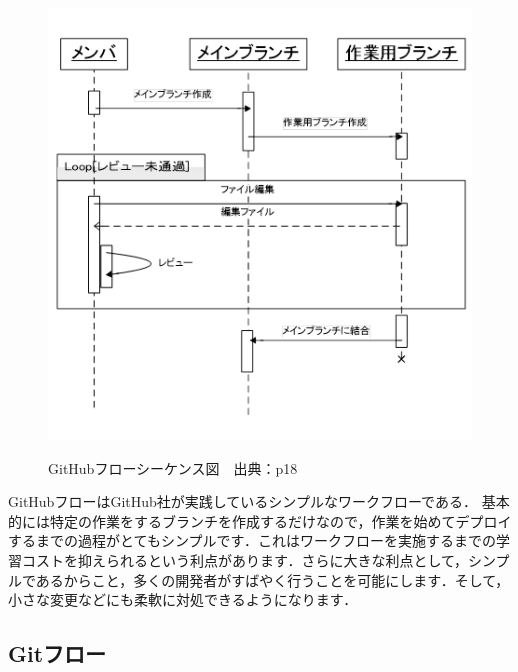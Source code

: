 \begin{figure}[H]
\centering　
\includegraphics{githubsi.png}
\caption{GitHubフローシーケンス図　出典：\cite{onodera2015}p18}\label{tab:githubsi}
\end{figure}


GitHubフローはGitHub社が実践しているシンプルなワークフローである．
基本的には特定の作業をするブランチを作成するだけなので，作業を始めてデプロイするまでの過程がとてもシンプルです．これはワークフローを実施するまでの学習コストを抑えられるという利点があります．さらに大きな利点として，シンプルであるからこと，多くの開発者がすばやく行うことを可能にします．そして，小さな変更などにも柔軟に対処できるようになります\cite{ohtsuka2014}．


\subsection{Gitフロー}

